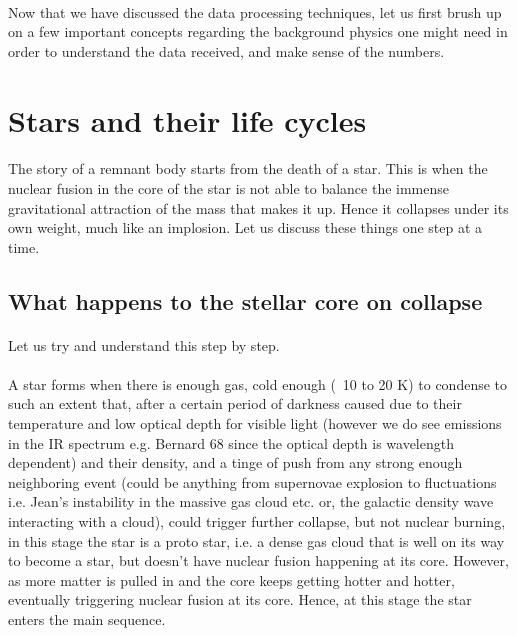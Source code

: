 \documentclass[a4paper,twoside]{report}
\numberwithin{equation}{section}
\begin{document}
\paragraph{}
Now that we have discussed the data processing techniques, let us first brush up on a few important concepts regarding the background physics one might need in order to understand the data received, and make sense of the numbers.
\section{Stars and their life cycles}
\paragraph{}
The story of a remnant body starts from the death of a star. This is when the nuclear fusion in the core of the star is not able to balance the immense gravitational attraction of the mass that makes it up. Hence it collapses under its own weight, much like an implosion. Let us discuss these things one step at a time. 
\subsection{What happens to the stellar core on collapse}
\paragraph{}
Let us try and understand this step by step. 
\paragraph{}
A star forms when there is enough gas, cold enough (~10 to 20 K) to condense to such an extent that, after a certain period of darkness caused due to their temperature and low optical depth for visible light (however we do see emissions in the IR spectrum e.g. Bernard 68 since the optical depth is wavelength dependent) and their density, and a tinge of push from any strong enough neighboring event (could be anything from supernovae explosion to fluctuations i.e. Jean's instability in the massive gas cloud etc. or, the galactic density wave interacting with a cloud), could trigger further collapse, but not nuclear burning, in this stage the star is a proto star, i.e. a dense gas cloud that is well on its way to become a star, but doesn't have nuclear fusion happening at its core. However, as more matter is pulled in and the core keeps getting hotter and hotter, eventually triggering nuclear fusion at its core. Hence, at this stage the star enters the main sequence. 
\end{document}
